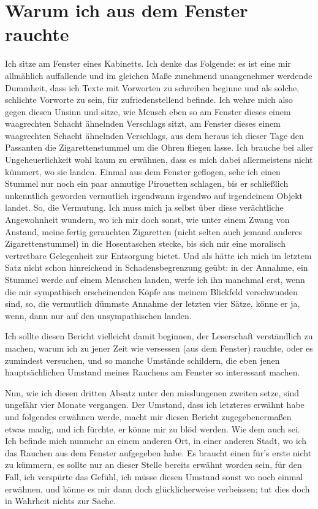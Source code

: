 \documentclass{scrbook}
\begin{document}
\chapter*{Warum ich aus dem Fenster rauchte}
\newpage
\noindent Ich sitze am Fenster eines Kabinetts. Ich denke das Folgende: es
ist eine mir allmählich auffallende und im gleichen Maße zunehmend
unangenehmer werdende Dummheit, dass ich Texte mit Vorworten zu schreiben
beginne und als solche, schlichte Vorworte zu sein, für zufriedenstellend
befinde. Ich wehre mich also gegen diesen Unsinn und sitze, wie Mensch eben
so am Fenster dieses einem waagrechten Schacht ähnelnden Verschlags sitzt, am
Fenster dieses einem waagrechten Schacht ähnelnden Verschlags, aus dem heraus
ich dieser Tage den Passanten die Zigarettenstummel um die Ohren fliegen
lasse. Ich brauche bei aller Ungeheuerlichkeit wohl kaum zu erwähnen, dass es
mich dabei allermeistens nicht kümmert, wo sie landen. Einmal aus dem Fenster
geflogen, sehe ich einen Stummel nur noch ein paar anmutige Pirouetten
schlagen, bis er schließlich unkenntlich geworden vermutlich irgendwann
irgendwo auf irgendeinem Objekt landet. So, die Vermutung. Ich muss mich ja
selbst über diese verächtliche Angewohnheit wundern, wo ich mir doch sonst,
wie unter einem Zwang von Anstand, meine fertig gerauchten Zigaretten (nicht
selten auch jemand anderes Zigarettenstummel) in die Hosentaschen stecke, bis
sich mir eine moralisch vertretbare Gelegenheit zur Entsorgung bietet. Und
als hätte ich mich im letztem Satz nicht schon hinreichend in
Schadensbegrenzung geübt: in der Annahme, ein Stummel werde auf einem
Menschen landen, werfe ich ihn manchmal erst, wenn die mir sympathisch
erscheinenden Köpfe aus meinem Blickfeld verschwunden sind, so, die
vermutlich dümmste Annahme der letzten vier Sätze, könne er ja, wenn, dann
nur auf den unsympathischen landen.

Ich sollte diesen Bericht vielleicht damit beginnen, der Leserschaft
verständlich zu machen, warum ich zu jener Zeit wie versessen (aus dem
Fenster) rauchte, oder es zumindest versuchen, und so manche Umstände
schildern, die eben jenen hauptsächlichen Umstand meines Rauchens am Fenster
so interessant machen.

Nun, wie ich diesen dritten Absatz unter den misslungenen zweiten setze, sind
ungefähr vier Monate vergangen. Der Umstand, dass ich letzteres erwähnt habe
und folgendes erwähnen werde, macht mir diesen Bericht zugegebenermaßen etwas
madig, und ich fürchte, er könne mir zu blöd werden. Wie dem auch sei. Ich
befinde mich nunmehr an einem anderen Ort, in einer anderen Stadt, wo ich das
Rauchen aus dem Fenster aufgegeben habe. Es braucht einen für's erste nicht
zu kümmern, es sollte nur an dieser Stelle bereits erwähnt worden sein, für
den Fall, ich verspürte das Gefühl, ich müsse diesen Umstand sonst wo noch
einmal erwähnen, und könne es mir dann doch glücklicherweise verbeissen; tut
dies doch in Wahrheit nichts zur Sache. 
\end{document}
